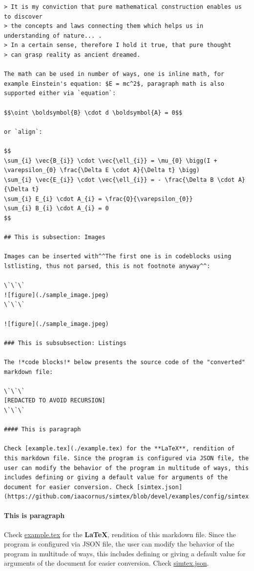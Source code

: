 \documentclass[12pt, UTF8]{article}
\begin{document}
\begin{lstlisting}
> It is my conviction that pure mathematical construction enables us to discover
> the concepts and laws connecting them which helps us in understanding of nature... .
> In a certain sense, therefore I hold it true, that pure thought
> can grasp reality as ancient dreamed.

The math can be used in number of ways, one is inline math, for example Einstein's equation: $E = mc^2$, paragraph math is also supported either via `equation`:

$$\oint \boldsymbol{B} \cdot d \boldsymbol{A} = 0$$

or `align`:

$$
\sum_{i} \vec{B_{i}} \cdot \vec{\ell_{i}} = \mu_{0} \bigg(I + \varepsilon_{0} \frac{\Delta E \cdot A}{\Delta t} \bigg)
\sum_{i} \vec{E_{i}} \cdot \vec{\ell_{i}} = - \frac{\Delta B \cdot A}{\Delta t}
\sum_{i} E_{i} \cdot A_{i} = \frac{Q}{\varepsilon_{0}}
\sum_{i} B_{i} \cdot A_{i} = 0
$$

## This is subsection: Images

Images can be inserted with^^The first one is in codeblocks using lstlisting, thus not parsed, this is not footnote anyway^^:

\`\`\`
![figure](./sample_image.jpeg)
\`\`\`

![figure](./sample_image.jpeg)

### This is subsubsection: Listings

The !*code blocks!* below presents the source code of the "converted" markdown file:

\`\`\`
[REDACTED TO AVOID RECURSION]
\`\`\`

#### This is paragraph

Check [example.tex](./example.tex) for the **LaTeX**, rendition of this markdown file. Since the program is configured via JSON file, the user can modify the behavior of the program in multitude of ways, this includes defining or giving a default value for arguments of the document for easier conversion. Check [simtex.json](https://github.com/iaacornus/simtex/blob/devel/examples/config/simtex.json).

\end{lstlisting}
	
	\paragraph{This is paragraph}
	
	Check \href{./example.tex}{example.tex} for the \textbf{\LaTeX{}}, rendition of this markdown file. Since the program is configured via JSON file, the user can modify the behavior of the program in multitude of ways, this includes defining or giving a default value for arguments of the document for easier conversion. Check \href{https://github.com/iaacornus/simtex/blob/devel/examples/config/simtex.json}{simtex.json}.
\end{document}
